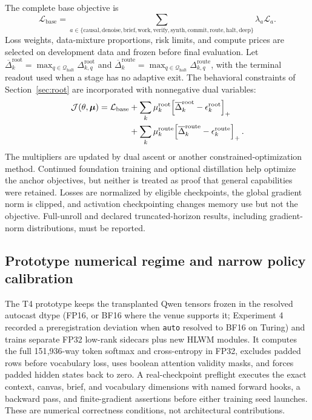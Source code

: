 \documentclass[10pt,a4paper]{article}
\newcommand{\eps}{\epsilon}
\newcommand{\Lcal}{\mathcal{L}}
\newcommand{\Jcal}{\mathcal{J}}
\newcommand{\Qcal}{\mathcal{Q}}
\begin{document}
The complete base objective is
\begin{equation}
\Lcal_{\mathrm{base}} = \sum_{a \in \{\mathrm{causal}, \mathrm{denoise},
\mathrm{brief}, \mathrm{work}, \mathrm{verify}, \mathrm{synth},
\mathrm{commit}, \mathrm{route}, \mathrm{halt}, \mathrm{deep}\}}
\lambda_a \Lcal_a .
\end{equation}
Loss weights, data-mixture proportions, risk limits, and compute prices are
selected on development data and frozen before final evaluation. Let
$\overline{\Delta}^{\mathrm{root}}_k = \max_{q \in \Qcal_{\mathrm{halt}}}
\Delta^{\mathrm{root}}_{k,q}$ and
$\overline{\Delta}^{\mathrm{route}}_k = \max_{q \in \Qcal_{\mathrm{halt}}}
\Delta^{\mathrm{route}}_{k,q}$, with the terminal readout used when a stage
has no adaptive exit. The behavioral constraints of
Section~\ref{sec:root} are incorporated with nonnegative dual variables:
\begin{equation}
\begin{aligned}
\Jcal(\theta, \boldsymbol{\mu}) = \Lcal_{\mathrm{base}}
&+ \sum_k \mu^{\mathrm{root}}_k
  \Bigl[ \overline{\Delta}^{\mathrm{root}}_k - \eps^{\mathrm{root}}_k \Bigr]_+ \\
&+ \sum_k \mu^{\mathrm{route}}_k
  \Bigl[ \overline{\Delta}^{\mathrm{route}}_k - \eps^{\mathrm{route}}_k \Bigr]_+ \,.
\end{aligned}
\end{equation}
The multipliers are updated by dual ascent or another constrained-optimization
method. Continued foundation training and optional distillation help optimize
the anchor objectives, but neither is treated as proof that general
capabilities were retained. Losses are normalized by eligible checkpoints, the
global gradient norm is clipped, and activation checkpointing changes memory
use but not the objective. Full-unroll and declared truncated-horizon results,
including gradient-norm distributions, must be reported.

\subsection{Prototype numerical regime and narrow policy calibration}

The T4 prototype keeps the transplanted Qwen tensors frozen in the resolved
autocast dtype (FP16, or BF16 where the venue supports it; Experiment 4 recorded a
preregistration deviation when \texttt{auto} resolved to BF16 on Turing) and
trains separate FP32 low-rank sidecars plus new HLWM modules. It computes the full
151{,}936-way token softmax and cross-entropy in FP32, excludes padded rows
before vocabulary loss, uses boolean attention validity masks, and forces
padded hidden states back to zero. A real-checkpoint preflight executes the
exact context, canvas, brief, and vocabulary dimensions with named forward
hooks, a backward pass, and finite-gradient assertions before either training
seed launches. These are numerical correctness conditions, not architectural
contributions.
\end{document}

